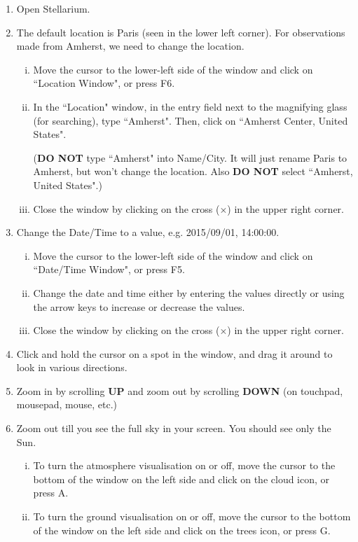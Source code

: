 \documentclass[main.tex]{subfiles}
\begin{document}
\begin{enumerate}
\item
Open Stellarium.
\item
The default location is Paris (seen in the lower left corner). For observations made from Amherst, we need to change the location.
\begin{enumerate}[i.]
    \item
    Move the cursor to the lower-left side of the window and click on ``Location Window", or press F6.
    \item
    In the ``Location" window, in the entry field next to the magnifying glass (for searching), type ``Amherst". Then, click on ``Amherst Center, United States".
    
    (\textbf{DO NOT} type ``Amherst" into Name/City. It will just rename Paris to Amherst, but won't change the location. Also \textbf{DO NOT} select ``Amherst, United States".)
    \item
    Close the window by clicking on the cross ($\times$) in the upper right corner.
\end{enumerate}
\item
Change the Date/Time to a value, e.g. 2015/09/01, 14:00:00.
\begin{enumerate}[i.]
    \item
    Move the cursor to the lower-left side of the window and click on ``Date/Time Window", or press F5.
    \item
    Change the date and time either by entering the values directly or using the arrow keys to increase or decrease the values.
    \item
    Close the window by clicking on the cross ($\times$) in the upper right corner.
\end{enumerate}
\item
Click and hold the cursor on a spot in the window, and drag it around to look in various directions.
\item
Zoom in by scrolling \textbf{UP} and zoom out by scrolling \textbf{DOWN} (on touchpad, mousepad, mouse, etc.)
\item
Zoom out till you see the full sky in your screen. You should see only the Sun.
\begin{enumerate}[i.]
    \item
    To turn the atmosphere visualisation on or off, move the cursor to the bottom of the window on the left side and click on the cloud icon, or press A.
    \item
    To turn the ground visualisation on or off, move the cursor to the bottom of the window on the left side and click on the trees icon, or press G.

\end{enumerate}
\end{enumerate}
\end{document}
